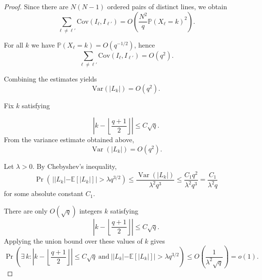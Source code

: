 \documentclass[10pt]{article}
\newcommand{\E}{\mathbb{E}}
\theoremstyle{definition}
\begin{document}
\begin{proof}
		Since there are $N(N-1)$ ordered pairs of distinct lines, we obtain
		\[
		\sum_{\ell\neq\ell'}
		\mathrm{Cov}(I_{\ell},I_{\ell'})
		=
		O\!\left(\frac{N^2}{q}\mathbb{P}(X_{\ell}=k)^2\right).
		\]
		
		For all $k$ we have $\mathbb{P}(X_{\ell}=k)= O( q^{-1/2})$, hence
		\[
		\sum_{\ell\neq\ell'}
		\mathrm{Cov}(I_{\ell},I_{\ell'})
		=
		O(q^2).
		\]
		
		Combining the estimates yields
		\[
		\mathrm{Var}(|L_k|)
		=
		O(q^2).
		\]
		

		Fix $k$ satisfying
		
		\[
		\left|k-\left\lfloor \frac{q+1}{2}\right\rfloor\right|\le C\sqrt q .
		\]
		From the variance estimate obtained above,
		\[
		\operatorname{Var}(|L_k|)=O(q^2).
		\]
		
		Let $\lambda>0$. By Chebyshev's inequality,
		\[
		\Pr\!\left(\,||L_k|-\mathbb{E}[|L_k|]|>\lambda q^{3/2}\right)
		\le
		\frac{\operatorname{Var}(|L_k|)}{\lambda^2 q^3}
		\le
		\frac{C_1 q^2}{\lambda^2 q^3}
		=
		\frac{C_1}{\lambda^2 q}
		\]
		for some absolute constant $C_1$.
		
		There are only $O(\sqrt q)$ integers $k$ satisfying
		\[
		\left|k-\left\lfloor \frac{q+1}{2}\right\rfloor\right|\le C\sqrt q .
		\]
		Applying the union bound over these values of $k$ gives
		\[
		\Pr\!\left(
		\exists\, k:\left|k-\left\lfloor \frac{q+1}{2}\right\rfloor\right|\le C\sqrt q
		\ \text{and}\ 
		||L_k|-\mathbb{E}[|L_k|]|>\lambda q^{3/2}
		\right)
		\le
		O\!\left(\frac{1}{\lambda^2\sqrt q}\right)
		=o(1).
		\]
		

\end{proof}
\end{document}
